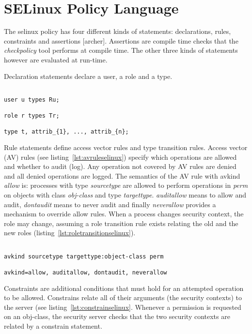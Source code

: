 \section{SELinux Policy Language}

The \ac{selinux} policy has four different kinds of statements: declarations, rules, constraints and assertions [archer]. Assertions are compile time checks that the \emph{checkpolicy} tool performs at compile time. The other three kinds of statements however are evaluated at run-time. 

Declaration statements declare a user, a role and a type. 

\lstset{language=selinux}
\begin{lstlisting}[frame=single, caption={Declarations},label={lst:declsselinux}]

user u types Ru;

role r types Tr;

type t, attrib_{1}, ..., attrib_{n};

\end{lstlisting}

Rule statements define access vector rules and type transition rules. Access vector (AV) rules (see listing~\ref{lst:avruleselinux}) specify which operations are allowed and whether to audit (log). Any operation not covered by AV rules are denied and all denied operations are logged. The semantics of the AV rule with avkind \emph{allow} is: processes with type \emph{sourcetype} are allowed to perform operations in \emph{perm} on objects with class \emph{obj-class} and type \emph{targettype}. \emph{auditallow} means to allow and audit, \emph{dontaudit} means to never audit and finally \emph{neverallow} provides a mechanism to override allow rules. When a process changes security context, the role may change, assuming a role transition rule exists relating the old and the new roles (listing~\ref{lst:roletransitionselinux}).

\lstset{language=selinux}
\begin{lstlisting}[frame=single, caption={AV Rule},label={lst:avruleselinux}]

avkind sourcetype targettype:object-class perm

avkind=allow, auditallow, dontaudit, neverallow
\end{lstlisting}

Constraints are additional conditions that must hold for an attempted operation to be allowed. Constrains relate all of their arguments (the security contexts) to the server (see listing~\ref{lst:constrainselinux}. Whenever a permission is requested on an obj-class, the security server checks that the two security contexts are related by a constrain statement.

